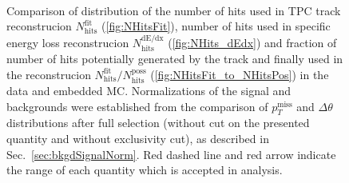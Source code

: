 \begin{figure}[hb]
{\begin{subfigure}[b]{\linewidth}
  \end{subfigure}\\
  \begin{minipage}[t][1.042\linewidth][t]{\linewidth}\vspace{10pt}
    \caption[Comparison of distribution of $N_{\text{hits}}^{\text{fit}}$,~$N_{\text{hits}}^{\text{dE/dx}}$ and $N_{\text{hits}}^{\text{fit}}/N_{\text{hits}}^{\text{poss}}$ in the data and embedded MC]
    {Comparison of distribution of the number of hits used in TPC track reconstrucion $N_{\text{hits}}^{\text{fit}}$ (\ref{fig:NHitsFit}), number of hits used in specific energy loss reconstrucion $N_{\text{hits}}^{\text{dE/dx}}$ (\ref{fig:NHits_dEdx}) and fraction of number of hits potentially generated by the track and finally used in the reconstrucion $N_{\text{hits}}^{\text{fit}}/N_{\text{hits}}^{\text{poss}}$ (\ref{fig:NHitsFit_to_NHitsPos}) in the data and embedded MC. Normalizations of the signal and backgrounds were established from the comparison of $p_{T}^{\text{miss}}$ and $\Delta\theta$ distributions after full selection (without cut on the presented quantity and without exclusivity cut), as described in Sec.~\ref{sec:bkgdSignalNorm}. Red dashed line and red arrow indicate the range of each quantity which is accepted in analysis.}\label{fig:NHits}
  \end{minipage}
}%

\end{figure}







